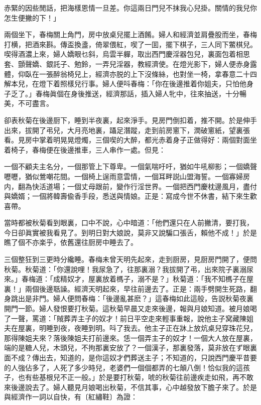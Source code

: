 \begin{myquote}
赤緊的因些閒話，把海樣恩情一旦差。你這兩日門兒不抹我心兒掛。關情的我兒你怎生便撇的下！」
\end{myquote}

兩個坐下，春梅關上角門，房中放桌兒擺上酒餚。婦人和經濟並肩疊股而坐，春梅打横，把酒來斟。傳盃換盞，倚翠偎紅，喫了一囬，擺下棋子，三人同下鱉棋兒。喫得酒濃上來，婦人嬌眼乜斜，烏雲半軃，取出西門慶淫器包兒，裏面包着相思套、顫聲嬌、銀託子、勉鈴，一弄兒淫器，教經濟使。在燈光影下，婦人便赤身露體，仰臥在一張醉翁椅兒上，經濟亦脱的上下沒條絲，也對坐一椅，拿春意二十四解本兒，在燈下着照樣兒行事。婦人便呌春梅：「你在後邊推着你姐夫，只怕他身子乏了。」春梅眞個在身後推送，經濟那話，插入婦人牝中，往來抽送，十分暢美，不可盡言。

卻表秋菊在後邊厨下，睡到半夜裏，起來淨手。見房門倒扣着，推不開。於是伸手出來，拔開了弔兒，大月亮地裏，躡足潛蹤，走到前房窻下，潤破窻紙，望裏張看。見房中掌着明晃晃燈燭，三個喫的大醉，都光赤着身子正做得好：兩個對面坐着椅子，春梅便在後邊推車，三人串作一處。但見：

\begin{myquote}
一個不顧夫主名分，一個那管上下尊卑。一個氣喘吁吁，猶如牛吼柳影；一個嬌聲嚦嚦，猶似鶯嘲花間。一個椅上逞雨意雲情，一個耳畔説山盟海誓。一個寡婦房内，翻為快活道場；一個丈母跟前，變作行淫世界。一個把西門慶枕邊風月，盡付與嬌婿；一個將韓壽偸香手段，悉送與情娘。正是：寫成今世不休書，結下來生歡喜帶。
\end{myquote}

當時都被秋菊看到眼裏，口中不說，心中暗道：「他們還只在人前撇清，要打我，今日卻眞實被我看見了。到明日對大娘說，莫非又說騙口張舌，賴他不成！」於是瞧了個不亦楽乎，依舊還往厨房中睡去了。

三個整狂到三更時分纔睡。春梅未曾天明先起來，走到厨房，見厨房門開了，便問秋菊。秋菊道：「你還說哩！我尿急了，往那裏溺？我拔開了弔，出來院子裏溺尿來。」春梅道：「成精奴才，屋裏放着榪子，溺不是？」秋菊道：「我不知榪子在屋裏！」兩個後邊聒譟。經濟天明起來，早往前邊去了。正是：兩手劈開生死路，翻身跳出是非門。婦人便問春梅：「後邊亂甚麽？」這春梅如此這般，告説秋菊夜裏開門一節。婦人發恨要打秋菊。這秋菊早晨又走來後邊，報與月娘知道。被月娘喝了一聲，罵道：「賊葬弄主子的奴才！前日平空走來輕事重報，說他主子窝藏陳姐夫在屋裏，明睡到夜，夜睡到明。呌了我去。他主子正在牀上放炕桌兒穿珠花兒，那得陳姐夫來？落後陳姐夫打前邊來。恁一個弄主子的奴才！一個大人放在屋裏，端的是糖人兒，木頭兒，不拘那裏安放了？一個漢子，那裏發落，莫非放在ず眼裏面不成？傳出去，知道的，是你這奴才們葬送主子；不知道的，只說西門慶平昔要的人強佔多了，人死了多少時兒，老婆們一個個都弄的七顛八倒！恰似我的這孩子，也有些基根兒不正一般。」於是要打秋菊，唬的秋菊往前邊疾走如飛，再不敢來後邊說去了。婦人聽見月娘喝出秋菊，不信其事，心中越發放下膽子來了。於是與經濟作一詞以自快，有〔紅繡鞋〕為證：

